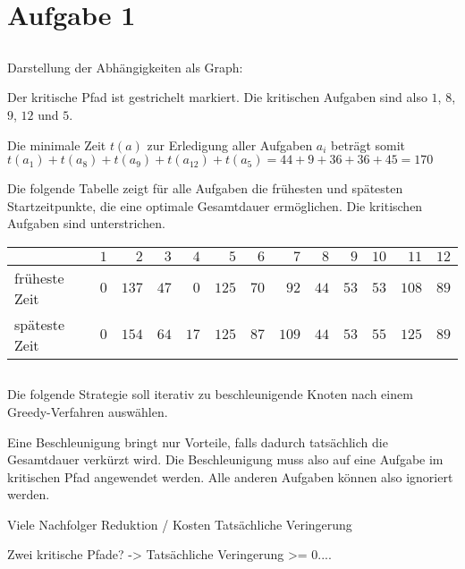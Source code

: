 \documentclass[a4paper]{article}
\begin{document}
\section{Aufgabe 1}

\subsection{}
Darstellung der Abhängigkeiten als Graph:


Der kritische Pfad ist gestrichelt markiert.
Die kritischen Aufgaben sind also $1$, $8$, $9$, $12$ und $5$.

Die minimale Zeit $t(a)$ zur Erledigung aller Aufgaben $a_i$ beträgt somit
$t(a_1) + t(a_8) + t(a_9) + t(a_12) + t(a_5) = 44 + 9 + 36 + 36 + 45 = 170$

Die folgende Tabelle zeigt für alle Aufgaben die frühesten und spätesten
Startzeitpunkte, die eine optimale Gesamtdauer ermöglichen. Die kritischen Aufgaben sind unterstrichen.

\begin{tabular}{lrrrrrrrrrrrr}
\hline
& \underline{$1$} & $2$ & $3$ & $4$ & \underline{$5$} & $6$ & $7$ & \underline{$8$} & \underline{$9$} & $10$ & $11$ & \underline{$12$} \\ 
\hline
früheste Zeit & $0$ & $137$ & $47$ & $0$ & $125$ & $70$ & $92$ & $44$ & $53$ & $53$ & $108$ & $89$ \\
späteste Zeit & $0$ & $154$ & $64$ & $17$ & $125$ & $87$ & $109$ & $44$ & $53$ & $55$ & $125$ & $89$ \\
\hline
\end{tabular}

\subsection{}
Die folgende Strategie soll iterativ zu beschleunigende Knoten nach einem
Greedy-Verfahren auswählen.

Eine Beschleunigung bringt nur Vorteile, falls dadurch tatsächlich die
Gesamtdauer verkürzt wird. Die Beschleunigung muss also auf eine Aufgabe im
kritischen Pfad angewendet werden. Alle anderen Aufgaben können also
ignoriert werden.

Viele Nachfolger
Reduktion / Kosten
Tatsächliche Veringerung

Zwei kritische Pfade? -> Tatsächliche Veringerung >= 0....
\end{document}
